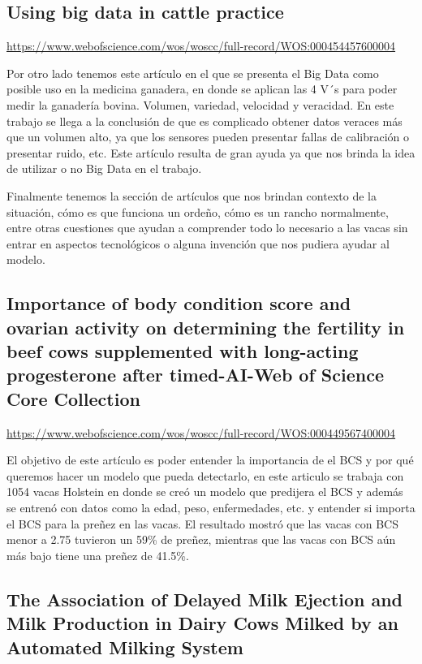 \documentclass[11pt,letterpaper,DIV=12]{scrartcl}
\begin{document}
\subsection{Using big data in cattle practice}

\url{https://www.webofscience.com/wos/woscc/full-record/WOS:000454457600004}

Por otro lado tenemos este artículo en el que se presenta el Big Data como posible uso en la medicina ganadera, en donde se aplican las 4 V´s para poder medir la ganadería bovina. Volumen, variedad, velocidad y veracidad. En este trabajo se llega a la conclusión de que es complicado obtener datos veraces más que un volumen alto, ya que los sensores pueden presentar fallas de calibración o presentar ruido, etc. Este artículo resulta de gran ayuda ya que nos brinda la idea de utilizar o no Big Data en el trabajo.

Finalmente tenemos la sección de artículos que nos brindan contexto de la situación, cómo es que funciona un ordeño, cómo es un rancho normalmente, entre otras cuestiones que ayudan a comprender todo lo necesario a las vacas sin entrar en aspectos tecnológicos o alguna invención que nos pudiera ayudar al modelo.

\subsection{Importance of body condition score and ovarian activity on determining the fertility in beef cows supplemented with long-acting progesterone after timed-AI-Web of Science Core Collection}

\url{https://www.webofscience.com/wos/woscc/full-record/WOS:000449567400004}

El objetivo de este artículo es poder entender la importancia de el BCS y por qué queremos hacer un modelo que pueda detectarlo, en este articulo se trabaja con 1054 vacas Holstein en donde se creó un modelo que predijera el BCS y además se entrenó con datos como la edad, peso, enfermedades, etc. y entender si importa el BCS para la preñez en las vacas. El resultado mostró que las vacas con BCS menor a 2.75 tuvieron un 59\% de preñez, mientras que las vacas con BCS aún más bajo tiene una preñez de 41.5\%.

\subsection{The Association of Delayed Milk Ejection and Milk Production in Dairy Cows Milked by an Automated Milking System}
\end{document}
